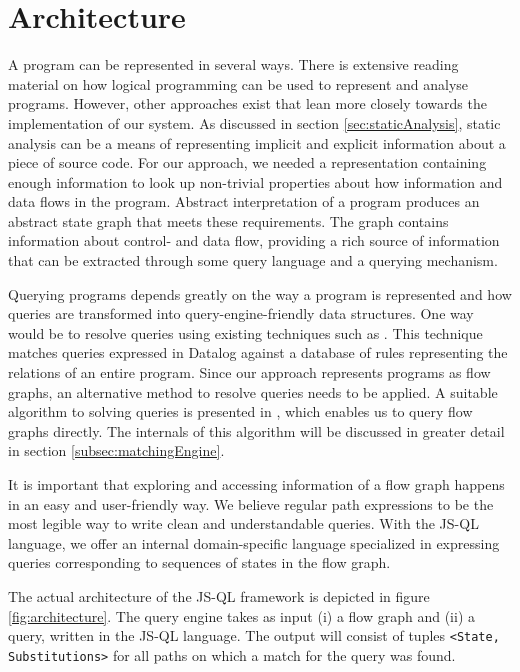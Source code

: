 \section{Architecture}
\label{sec:Architecture}
A program can be represented in several ways. There is extensive reading material on how logical programming can be used to represent and analyse programs\cite{Reps1995}\cite{DatalogDBQueries}. However, other approaches exist that lean more closely towards the implementation of our system.  As discussed in section \ref{sec:staticAnalysis}, static analysis can be a means of representing implicit and explicit information about a piece of source code. For our approach, we needed a representation containing enough information to look up non-trivial properties about how information and data flows in the program. Abstract interpretation of a program produces an abstract state graph that meets these requirements. The graph contains information about control- and data flow, providing a rich source of information that can be extracted through some query language and a querying mechanism. 

Querying programs depends greatly on the way a program is represented and how queries are transformed into query-engine-friendly data structures. One way would be to resolve queries using existing techniques such as \cite{bddbddb}. This technique matches queries expressed in Datalog against a database of rules representing the relations of an entire program. Since our approach represents programs as flow graphs, an alternative method to resolve queries needs to be applied. A suitable algorithm to solving queries is presented in \cite{algoEngine}, which enables us to query flow graphs directly. The internals of this algorithm will be discussed in greater detail in section \ref{subsec:matchingEngine}.

It is important that exploring and accessing information of a flow graph happens in an easy and user-friendly way. We believe regular path expressions to be the most legible way to write clean and understandable queries. With the JS-QL language, we offer an internal domain-specific language specialized in expressing queries corresponding to sequences of states in the flow graph. 

The actual architecture of the JS-QL framework is depicted in figure \ref{fig:architecture}. The query engine takes as input (i) a flow graph and (ii) a query, written in the JS-QL language. The output will consist of tuples \texttt{<State, Substitutions>} for all paths on which a match for the query was found.

